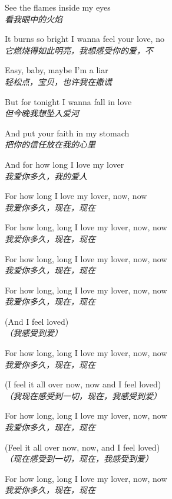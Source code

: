 \begin{spacing}{1.5}
\begin{flushleft}
See the flames inside my eyes\\
\textit{看我眼中的火焰}\lyricspace

It burns so bright I wanna feel your love, no\\
\textit{它燃烧得如此明亮，我想感受你的爱，不}\lyricspace

Easy, baby, maybe I'm a liar\\
\textit{轻松点，宝贝，也许我在撒谎}\lyricspace

But for tonight I wanna fall in love\\
\textit{但今晚我想坠入爱河}\lyricspace

And put your faith in my stomach\\
\textit{把你的信任放在我的心里}\lyricspace

And for how long I love my lover\\
\textit{我爱你多久，我的爱人}\lyricspace

For how long I love my lover, now, now\\
\textit{我爱你多久，现在，现在}\lyricspace

For how long, long I love my lover, now, now\\
\textit{我爱你多久，现在，现在}\lyricspace

For how long, long I love my lover, now, now\\
\textit{我爱你多久，现在，现在}\lyricspace

For how long, long I love my lover, now, now\\
\textit{我爱你多久，现在，现在}\lyricspace

(And I feel loved)\\
\textit{（我感受到爱）}\lyricspace

For how long, long I love my lover, now, now\\
\textit{我爱你多久，现在，现在}\lyricspace

(I feel it all over now, now and I feel loved)\\
\textit{（我现在感受到一切，现在，我感受到爱）}\lyricspace

For how long, long I love my lover, now, now\\
\textit{我爱你多久，现在，现在}\lyricspace

(Feel it all over now, now, and I feel loved)\\
\textit{（现在感受到一切，现在，我感受到爱）}\lyricspace

For how long, long I love my lover, now, now\\
\textit{我爱你多久，现在，现在}\lyricspace


\end{flushleft}
\end{spacing}
